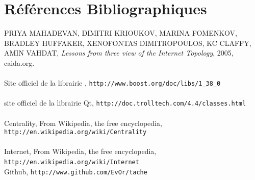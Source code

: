 \section*{R\'ef\'erences Bibliographiques}



\label{bib_3view}
PRIYA MAHADEVAN, DIMITRI KRIOUKOV, MARINA FOMENKOV, BRADLEY HUFFAKER, XENOFONTAS DIMITROPOULOS, KC CLAFFY, AMIN VAHDAT, \textit{Lessons from three view of the Internet Topology}, 2005, caida.org.\\
~\\
\label{bib_boost}
Site officiel de la librairie \boost, \verb|http://www.boost.org/doc/libs/1_38_0|\\
~\\
\label{bib_qt}
site officiel de la librairie Qt, \verb|http://doc.trolltech.com/4.4/classes.html|\\
~\\
\label{bib_wiki_centrality}
Centrality, From Wikipedia, the free encyclopedia, \verb|http://en.wikipedia.org/wiki/Centrality|\\
~\\
\label{bib_wiki_internet}
Internet, From Wikipedia, the free encyclopedia, \verb|http://en.wikipedia.org/wiki/Internet|
~\\
\label{bib_github}
Github,
 \verb|http://www.github.com/EvOr/tache|